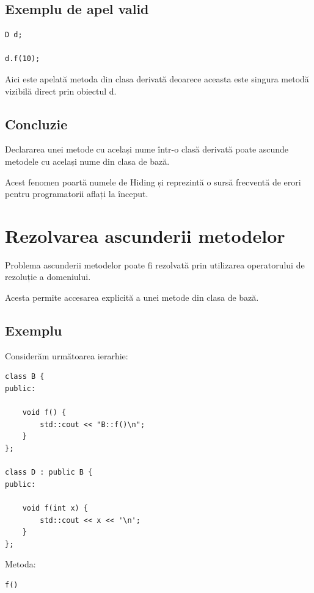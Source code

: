 \documentclass[12pt,a4paper]{article}
\begin{document}
\subsection{Exemplu de apel valid}

\begin{verbatim}
D d;

d.f(10);
\end{verbatim}

Aici este apelată metoda din clasa derivată deoarece aceasta este singura metodă vizibilă direct prin obiectul d.

\subsection{Concluzie}

Declararea unei metode cu același nume într-o clasă derivată poate ascunde metodele cu același nume din clasa de bază.

Acest fenomen poartă numele de Hiding și reprezintă o sursă frecventă de erori pentru programatorii aflați la început.








\section{Rezolvarea ascunderii metodelor}

Problema ascunderii metodelor poate fi rezolvată prin utilizarea operatorului de rezoluție a domeniului.

Acesta permite accesarea explicită a unei metode din clasa de bază.

\subsection{Exemplu}

Considerăm următoarea ierarhie:

\begin{verbatim}
class B {
public:

    void f() {
        std::cout << "B::f()\n";
    }
};

class D : public B {
public:

    void f(int x) {
        std::cout << x << '\n';
    }
};
\end{verbatim}

Metoda:

\begin{verbatim}
f()
\end{verbatim}
\end{document}
